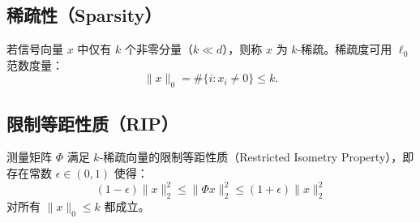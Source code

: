 \documentclass[lang=cn,newtx,10pt,scheme=chinese,chinesefont=nofont,citestyle=gb7714-2015, bibstyle=gb7714-2015]{elegantbook}
\begin{document}
\begin{refsection}
\subsection{稀疏性（Sparsity）}
若信号向量 $x$ 中仅有 $k$ 个非零分量（$k\ll d$），则称 $x$ 为 $k$-稀疏。稀疏度可用 $\ell_0$ 范数度量：
\[
  \|x\|_0 = \#\{i: x_i \neq 0\} \le k.
\]



\subsection{限制等距性质（RIP）}
测量矩阵 $\Phi$ 满足 $k$-稀疏向量的限制等距性质（Restricted Isometry Property），即存在常数 $\epsilon \in(0,1)$ 使得：
\[
  (1-\epsilon)\|x\|_2^2 \le \|\Phi x\|_2^2 \le (1+\epsilon)\|x\|_2^2
\]
对所有 $\|x\|_0\le k$ 都成立。




\end{refsection}
\end{document}
